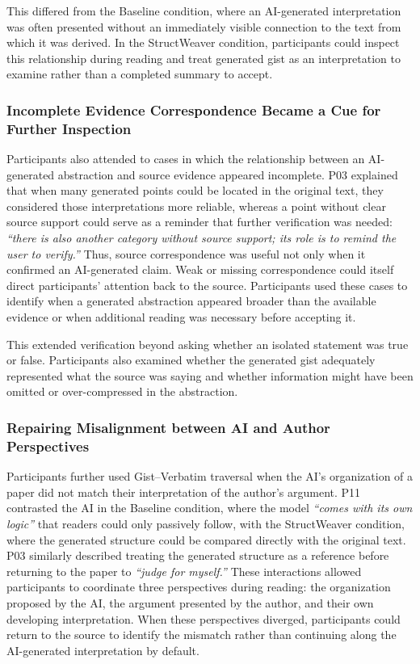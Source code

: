 \documentclass[manuscript,review,anonymous]{acmart}
\begin{document}
This differed from the Baseline condition, where an AI-generated interpretation was often presented without an immediately visible connection to the text from which it was derived. In the StructWeaver condition, participants could inspect this relationship during reading and treat generated gist as an interpretation to examine rather than a completed summary to accept.

\subsubsection{Incomplete Evidence Correspondence Became a Cue for Further Inspection}

Participants also attended to cases in which the relationship between an AI-generated abstraction and source evidence appeared incomplete. P03 explained that when many generated points could be located in the original text, they considered those interpretations more reliable, whereas a point without clear source support could serve as a reminder that further verification was needed: \textit{``there is also another category without source support; its role is to remind the user to verify.''} Thus, source correspondence was useful not only when it confirmed an AI-generated claim. Weak or missing correspondence could itself direct participants' attention back to the source. Participants used these cases to identify when a generated abstraction appeared broader than the available evidence or when additional reading was necessary before accepting it.

This extended verification beyond asking whether an isolated statement was true or false. Participants also examined whether the generated gist adequately represented what the source was saying and whether information might have been omitted or over-compressed in the abstraction.

\subsubsection{Repairing Misalignment between AI and Author Perspectives}

Participants further used Gist--Verbatim traversal when the AI's organization of a paper did not match their interpretation of the author's argument. P11 contrasted the AI in the Baseline condition, where the model \textit{``comes with its own logic''} that readers could only passively follow, with the StructWeaver condition, where the generated structure could be compared directly with the original text. P03 similarly described treating the generated structure as a reference before returning to the paper to \textit{``judge for myself.''} These interactions allowed participants to coordinate three perspectives during reading: the organization proposed by the AI, the argument presented by the author, and their own developing interpretation. When these perspectives diverged, participants could return to the source to identify the mismatch rather than continuing along the AI-generated interpretation by default.
\end{document}
